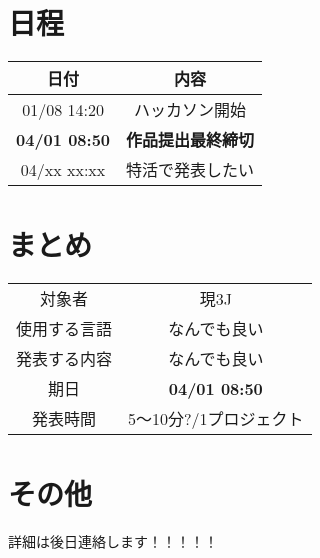 \documentclass[a4j]{jarticle}
\begin{document}
\section{日程}

\begin{table}[H]
    \center
    \begin{tabular}{c|c} \hline
        日付 & 内容 \\ \hline
        01/08 14:20 & ハッカソン開始 \\
        \textbf{04/01 08:50} & \textbf{作品提出最終締切}\footnotemark \\
        04/xx xx:xx & 特活で発表したい\footnotemark \\ \hline
    \end{tabular}
\end{table}

\section{まとめ}
\begin{table}[H]
    \center
    \begin{tabular}{c|c} \hline
        対象者 & 現3J \\
        使用する言語 & なんでも良い \\
        発表する内容 & なんでも良い \\
        期日 & \textbf{04/01 08:50}  \\
        発表時間 & 5〜10分?/1プロジェクト  \\ \hline
    \end{tabular}
\end{table}

\section{その他}
詳細は後日連絡します！！！！！

\end{document}
